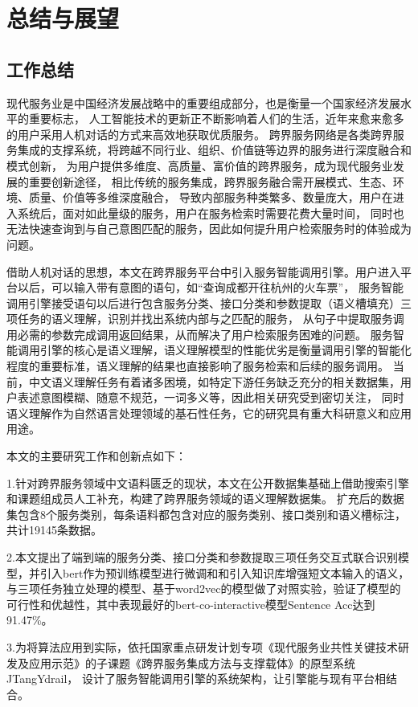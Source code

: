 \chapter{总结与展望}
\section{工作总结}
现代服务业是中国经济发展战略中的重要组成部分，也是衡量一个国家经济发展水平的重要标志，
人工智能技术的更新正不断影响着人们的生活，近年来愈来愈多的用户采用人机对话的方式来高效地获取优质服务。
跨界服务网络是各类跨界服务集成的支撑系统，将跨越不同行业、组织、价值链等边界的服务进行深度融合和模式创新，
为用户提供多维度、高质量、富价值的跨界服务，成为现代服务业发展的重要创新途径，
相比传统的服务集成，跨界服务融合需开展模式、生态、环境、质量、价值等多维深度融合，
导致内部服务种类繁多、数量庞大，用户在进入系统后，面对如此量级的服务，用户在服务检索时需要花费大量时间，
同时也无法快速查询到与自己意图匹配的服务，因此如何提升用户检索服务时的体验成为问题。

借助人机对话的思想，本文在跨界服务平台中引入服务智能调用引擎。用户进入平台以后，可以输入带有意图的语句，如“查询成都开往杭州的火车票”，
服务智能调用引擎接受语句以后进行包含服务分类、接口分类和参数提取（语义槽填充）三项任务的语义理解，识别并找出系统内部与之匹配的服务，
从句子中提取服务调用必需的参数完成调用返回结果，从而解决了用户检索服务困难的问题。
服务智能调用引擎的核心是语义理解，语义理解模型的性能优劣是衡量调用引擎的智能化程度的重要标准，语义理解的结果也直接影响了服务检索和后续的服务调用。
当前，中文语义理解任务有着诸多困境，如特定下游任务缺乏充分的相关数据集，用户表述意图模糊、随意不规范，一词多义等，因此相关研究受到密切关注，
同时语义理解作为自然语言处理领域的基石性任务，它的研究具有重大科研意义和应用用途。

本文的主要研究工作和创新点如下：

1.针对跨界服务领域中文语料匮乏的现状，本文在公开数据集基础上借助搜索引擎和课题组成员人工补充，构建了跨界服务领域的语义理解数据集。
扩充后的数据集包含8个服务类别，每条语料都包含对应的服务类别、接口类别和语义槽标注，共计19145条数据。

2.本文提出了端到端的服务分类、接口分类和参数提取三项任务交互式联合识别模型，并引入bert作为预训练模型进行微调和和引入知识库增强短文本输入的语义，
与三项任务独立处理的模型、基于word2vec的模型做了对照实验，验证了模型的可行性和优越性，其中表现最好的bert-co-interactive模型Sentence Acc达到91.47\%。

3.为将算法应用到实际，依托国家重点研发计划专项《现代服务业共性关键技术研发及应用示范》的子课题《跨界服务集成方法与支撑载体》的原型系统JTangYdrail，
设计了服务智能调用引擎的系统架构，让引擎能与现有平台相结合。

